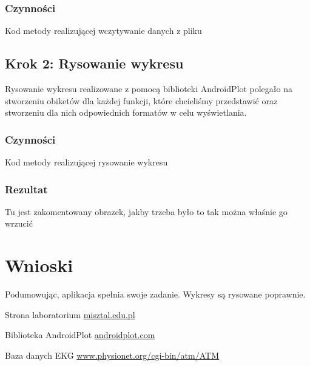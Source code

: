\documentclass{article}
\begin{document}
\subsubsection{Czynności}
Kod metody realizującej wczytywanie danych z pliku


\subsection{Krok 2: Rysowanie wykresu}
Rysowanie wykresu realizowane z pomocą biblioteki AndroidPlot polegało na stworzeniu obiketów dla każdej funkcji, które chcieliśmy przedstawić oraz stworzeniu dla nich odpowiednich formatów w celu wyświetlania.

\subsubsection{Czynności}
Kod metody realizującej rysowanie wykresu


\subsubsection{Rezultat}
Tu jest zakomentowany obrazek, jakby trzeba było to tak można właśnie go wrzucić


\section{Wnioski}
Podumowując, aplikacja spełnia swoje zadanie. Wykresy są rysowane poprawnie. 
\clearpage
{}
\begin{thebibliography}{9}

 Strona laboratorium 
\url{misztal.edu.pl}

 Biblioteka AndroidPlot
\url{androidplot.com}


 Baza danych EKG
\url{www.physionet.org/cgi-bin/atm/ATM}

\end{thebibliography}
\end{document}
